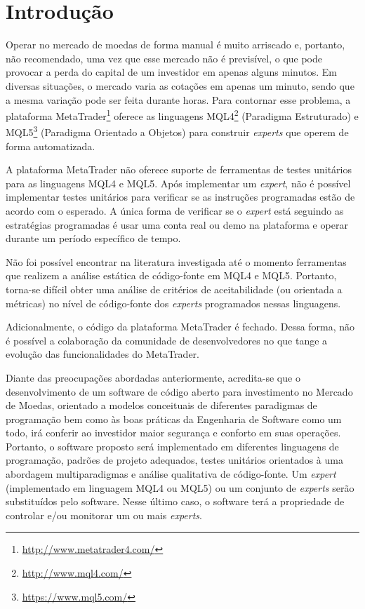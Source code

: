 \chapter{Introdução}

Operar no mercado de moedas de forma manual é muito arriscado e, portanto, não recomendado, uma vez que esse mercado não é previsível, o que pode provocar a perda do capital de um investidor em apenas alguns minutos. Em diversas situações, o mercado varia as cotações em apenas um minuto, sendo que a mesma variação pode ser feita durante horas. Para contornar esse problema, a plataforma MetaTrader\footnote{\url{http://www.metatrader4.com/}} oferece as linguagens MQL4\footnote{\url{http://www.mql4.com/}} (Paradigma Estruturado) e MQL5\footnote{\url{https://www.mql5.com/}} (Paradigma Orientado a Objetos) para construir \textit{experts} que operem de forma automatizada. 

A plataforma MetaTrader não oferece suporte de ferramentas de testes unitários para as linguagens MQL4 e MQL5. Após implementar um \textit{expert}, não é possível implementar testes unitários para verificar se as instruções programadas estão de acordo com o esperado. A única forma de verificar se o \textit{expert} está seguindo as estratégias programadas é usar uma conta real ou demo na plataforma e operar durante um período específico de tempo.

Não foi possível encontrar na literatura investigada até o momento ferramentas que realizem a análise estática de código-fonte em MQL4 e MQL5. Portanto, torna-se difícil obter uma análise de critérios de aceitabilidade (ou orientada a métricas) no nível de código-fonte dos \textit{experts} programados nessas linguagens.

Adicionalmente, o código da plataforma MetaTrader é fechado. Dessa forma, não é possível a colaboração da comunidade de desenvolvedores no que tange a evolução das funcionalidades do MetaTrader.

Diante das preocupações abordadas anteriormente, acredita-se que o desenvolvimento de um software de código aberto para investimento no Mercado de Moedas, orientado a modelos conceituais de diferentes paradigmas de programação bem como às boas práticas da Engenharia de Software como um todo, irá conferir ao investidor maior segurança e conforto em suas operações. Portanto, o software proposto será implementado em diferentes linguagens de programação, padrões de projeto adequados, testes unitários orientados à uma abordagem multiparadigmas e análise qualitativa de código-fonte. Um \textit{expert} (implementado em linguagem MQL4 ou MQL5) ou um conjunto de \textit{experts} serão substituídos pelo software. Nesse último caso, o software terá a propriedade de controlar e/ou monitorar um ou mais \textit{experts}.


